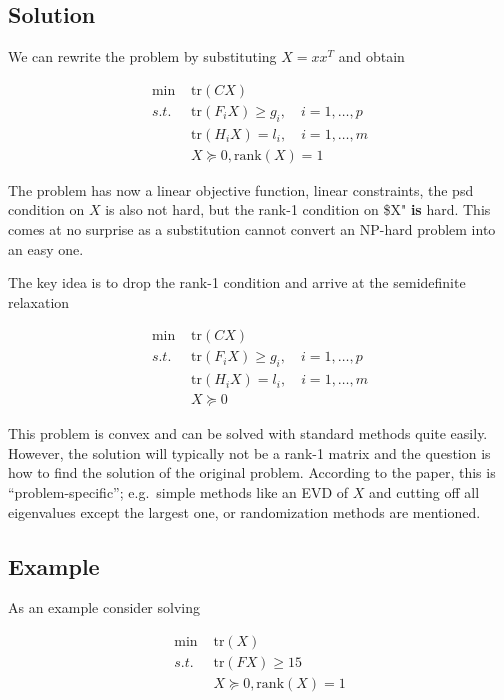 \subsection{Solution}

We can rewrite the problem by substituting \(X = x x^T\) and obtain


\begin{align*}
\min \,\, & \text{tr} (C X) \\
s.t. & \text{tr} (F_i X) \geq g_i, \quad i=1,\ldots,p \\
     & \text{tr} (H_i X) = l_i, \quad i=1,\ldots,m \\
     & X \succeq 0, \text{rank}(X) = 1
\end{align*}


The problem has now a linear objective function, linear constraints, the psd condition on \(X\) is also not hard, but the rank-1 condition on \$X" \textbf{is} hard. This comes at no surprise as a substitution cannot convert an NP-hard problem into an easy one.

The key idea is to drop the rank-1 condition and arrive at the semidefinite relaxation


\begin{align*}
\min \,\, & \text{tr} (C X) \\
s.t. & \text{tr}(F_i X) \geq g_i, \quad i=1,\ldots,p \\
     & \text{tr}(H_i X) = l_i, \quad i=1,\ldots,m \\
     & X \succeq 0
\end{align*}


This problem is convex and can be solved with standard methods quite
easily. However, the solution will typically not be a rank-1 matrix and
the question is how to find the solution of the original problem.
According to the paper, this is ``problem-specific''; e.g.~simple
methods like an EVD of \(X\) and cutting off all eigenvalues except the
largest one, or randomization methods are mentioned.

\subsection{Example}

As an example consider solving

\begin{align*}
\min \,\, & \text{tr} (X) \\
s.t. & \text{tr}(F X) \geq 15 \\
     & X \succeq 0, \text{rank}(X) = 1
\end{align*}


